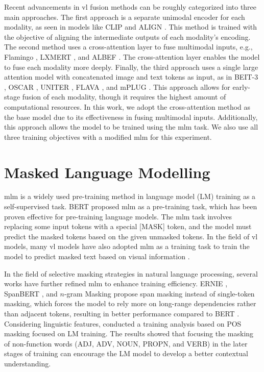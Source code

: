 Recent advancements in \acrshort{vl} fusion methods can be roughly categorized into three main approaches.  
The first approach is a separate unimodal encoder for each modality, as seen in models like CLIP \cite{clip} and ALIGN \cite{align}.  
This method is trained with the objective of aligning the intermediate outputs of each modality's encoding.  
The second method uses a cross-attention layer to fuse multimodal inputs, e.g., Flamingo \cite{flamingo}, LXMERT \cite{lxmert}, and ALBEF \cite{albef}.  
The cross-attention layer enables the model to fuse each modality more deeply.  
Finally, the third approach uses a single large attention model with concatenated image and text tokens as input, as in BEIT-3 \cite{beit-3}, OSCAR \cite{oscar}, UNITER \cite{uniter}, FLAVA \cite{flava}, and mPLUG \cite{mplug}.  
This approach allows for early-stage fusion of each modality, though it requires the highest amount of computational resources.  
In this work, we adopt the cross-attention method as the base model due to its effectiveness in fusing multimodal inputs.  
Additionally, this approach allows the model to be trained using the \acrshort{mlm} task.  
We also use all three training objectives with a modified \acrshort{mlm} for this experiment.  

\section{Masked Language Modelling}
\acrshort{mlm} is a widely used pre-training method in language model (LM) training \cite{bert, albert, dictbert, opt, realm} as a self-supervised task.  
BERT \cite{bert} proposed \acrshort{mlm} as a pre-training task, which has been proven effective for pre-training language models.  
The \acrshort{mlm} task involves replacing some input tokens with a special [MASK] token, and the model must predict the masked tokens based on the given unmasked tokens.  
In the field of \acrshort{vl} models, many \acrshort{vl} models have also adopted \acrshort{mlm} as a training task to train the model to predict masked text based on visual information \cite{albef, mplug, uniter, beit-3}.  

In the field of selective masking strategies in natural language processing, several works have further refined \acrshort{mlm} to enhance training efficiency.  
ERNIE \cite{ERNIE}, SpanBERT \cite{spanBERT}, and \(n\)-gram Masking \cite{n-gram-masking} propose span masking instead of single-token masking, which forces the model to rely more on long-range dependencies rather than adjacent tokens, resulting in better performance compared to BERT \cite{bert}.  
Considering linguistic features,  conducted a training analysis based on POS masking focused on LM training.  
The results showed that focusing the masking of non-function words (ADJ, ADV, NOUN, PROPN, and VERB) in the later stages of training can encourage the LM model to develop a better contextual understanding.  


